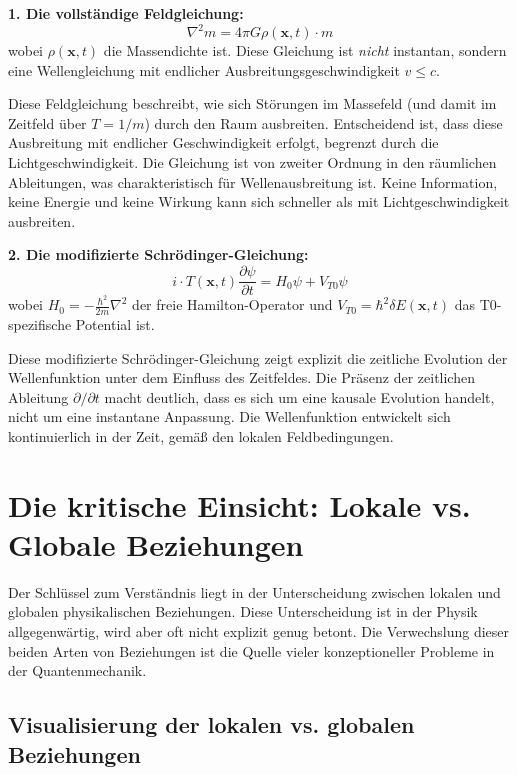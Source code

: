 \documentclass[12pt,a4paper]{article}
\begin{document}
	\textbf{1. Die vollständige Feldgleichung:}
	\begin{equation}
		\nabla^2 m = 4\pi G \rho(\mathbf{x},t) \cdot m \label{eq:field_equation}
	\end{equation}
	wobei $\rho(\mathbf{x},t)$ die Massendichte ist. Diese Gleichung ist \emph{nicht} instantan, sondern eine Wellengleichung mit endlicher Ausbreitungsgeschwindigkeit $v \leq c$.
	
	Diese Feldgleichung beschreibt, wie sich Störungen im Massefeld (und damit im Zeitfeld über $T = 1/m$) durch den Raum ausbreiten. Entscheidend ist, dass diese Ausbreitung mit endlicher Geschwindigkeit erfolgt, begrenzt durch die Lichtgeschwindigkeit. Die Gleichung ist von zweiter Ordnung in den räumlichen Ableitungen, was charakteristisch für Wellenausbreitung ist. Keine Information, keine Energie und keine Wirkung kann sich schneller als mit Lichtgeschwindigkeit ausbreiten.
	
	\textbf{2. Die modifizierte Schrödinger-Gleichung:}
	\begin{equation}
		i \cdot T(\mathbf{x},t) \frac{\partial \psi}{\partial t} = H_0 \psi + V_{T0} \psi \label{eq:schroedinger}
	\end{equation}
	wobei $H_0 = -\frac{\hbar^2}{2m}\nabla^2$ der freie Hamilton-Operator und $V_{T0} = \hbar^2 \delta E(\mathbf{x},t)$ das T0-spezifische Potential ist.
	
	Diese modifizierte Schrödinger-Gleichung zeigt explizit die zeitliche Evolution der Wellenfunktion unter dem Einfluss des Zeitfeldes. Die Präsenz der zeitlichen Ableitung $\partial/\partial t$ macht deutlich, dass es sich um eine kausale Evolution handelt, nicht um eine instantane Anpassung. Die Wellenfunktion entwickelt sich kontinuierlich in der Zeit, gemäß den lokalen Feldbedingungen.
	
	\section{Die kritische Einsicht: Lokale vs. Globale Beziehungen}
	
	Der Schlüssel zum Verständnis liegt in der Unterscheidung zwischen lokalen und globalen physikalischen Beziehungen. Diese Unterscheidung ist in der Physik allgegenwärtig, wird aber oft nicht explizit genug betont. Die Verwechslung dieser beiden Arten von Beziehungen ist die Quelle vieler konzeptioneller Probleme in der Quantenmechanik.
	\subsection{Visualisierung der lokalen vs. globalen Beziehungen}
	
\end{document}
